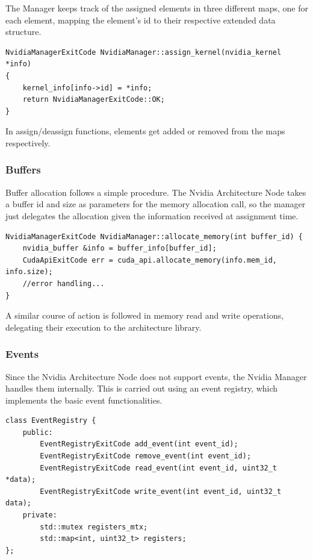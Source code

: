 The Manager keeps track of the assigned elements in three different maps, one for each element, mapping the element's id to their respective extended data structure.

\begin{lstlisting}[style=CStyle, caption=HHAL Nvidia Manager - Kernel assignment]
NvidiaManagerExitCode NvidiaManager::assign_kernel(nvidia_kernel *info) 
{
    kernel_info[info->id] = *info;
    return NvidiaManagerExitCode::OK;
}
\end{lstlisting}

In assign/deassign functions, elements get added or removed from the maps respectively.

\subsubsection{Buffers}

Buffer allocation follows a simple procedure. The Nvidia Architecture Node takes a buffer id and size as parameters for the memory allocation call, so the manager just delegates the allocation given the information received at assignment time.

\begin{lstlisting}[style=CStyle, caption=HHAL Nvidia Manager - Kernel assignment]
NvidiaManagerExitCode NvidiaManager::allocate_memory(int buffer_id) {
    nvidia_buffer &info = buffer_info[buffer_id];
    CudaApiExitCode err = cuda_api.allocate_memory(info.mem_id, info.size);
    //error handling...
}
\end{lstlisting}

A similar course of action is followed in memory read and write operations, delegating their execution to the architecture library.

\subsubsection{Events}

Since the Nvidia Architecture Node does not support events, the Nvidia Manager handles them internally. This is carried out using an event registry, which implements the basic event functionalities.

\begin{lstlisting}[style=CStyle, caption=HHAL Nvidia Manager - Event registry]
class EventRegistry {
    public:
        EventRegistryExitCode add_event(int event_id);
        EventRegistryExitCode remove_event(int event_id);
        EventRegistryExitCode read_event(int event_id, uint32_t *data);
        EventRegistryExitCode write_event(int event_id, uint32_t data);
    private:
        std::mutex registers_mtx;
        std::map<int, uint32_t> registers;
};
\end{lstlisting}

